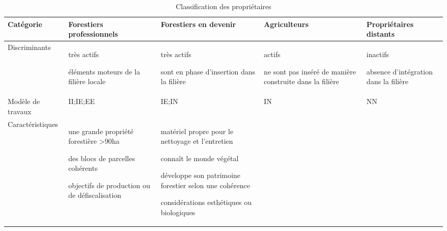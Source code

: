 \documentclass[12pt]{report}
\newcounter{table1}
\begin{document}
\begin{sidewaystable}%
  \centering%
  \caption{Classification des propriétaires}\label{tab:typ}%
  \begin{tabulary}{\columnwidth}{|p{28mm}|p{45mm}|p{45mm}|p{45mm}|p{45mm}|}%
    \hline Catégorie & Forestiers professionnels & Forestiers en devenir &%
    Agriculteurs & Propriétaires distants\\%
    \hline Discriminants&%
      \begin{compactitem}%
	\item très actifs%
	\item éléments moteurs de la filière locale%
      \end{compactitem}&%
      \begin{compactitem}%
	\item très actifs%
	\item sont en phase d'insertion dans la filière%
      \end{compactitem}&%
      \begin{compactitem}%
	\item actifs%
	\item ne sont pas inséré de manière construite dans la filière%
      \end{compactitem}&%
      \begin{compactitem}%
	\item inactifs%
	\item absence d'intégration dans la filière%
      \end{compactitem}\\%
    \hline Modèle de travaux&II;IE;EE&IE;IN&IN&NN\\%
    \hline Caractéristiques&%
      \begin{compactitem}%
	\item une grande propriété forestière >90ha%
	\item des blocs de parcelles cohérents%
	\item objectifs de production ou de défiscalisation%
      \end{compactitem}&%
      \begin{compactitem}%
	\item matériel propre pour le nettoyage et l'entretien%
	\item connaît le monde végétal%
	\item développe son patrimoine forestier selon une cohérence%
	\item considérations esthétiques ou biologiques%
      \end{compactitem}&%

\end{tabulary}
\end{sidewaystable}
\end{document}
